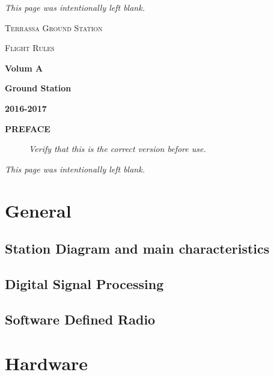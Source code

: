 \documentclass[12pt,a4paper]{article}
\begin{document}



\begin{center}
	{\itshape This page was intentionally left blank.\par}
\end{center}
\pagebreak


\begin{center}
	{\scshape\large Terrassa Ground Station\par}
	{\scshape\large Flight Rules\par}
	\vspace{0.5cm}
	{\large\bfseries Volum A \par}
	{\large\bfseries Ground Station \par}
	{\bfseries 2016-2017 \par}
	\vspace{1cm}
	{\large\bfseries PREFACE \par}
	\vspace{0.3cm}
	
	
	\begin{figure}[b]
		\centering
		{\itshape Verify that this is the correct version before use.\par}
	\end{figure}
\end{center}
\newpage

\begin{center}
	{\itshape This page was intentionally left blank.\par}
\end{center}
\pagebreak


\tableofcontents
\pagebreak

\section{General}
\subsection{Station Diagram and main characteristics}
\subsection{Digital Signal Processing}
\subsection{Software Defined Radio}
\section{Hardware}
\end{document}
